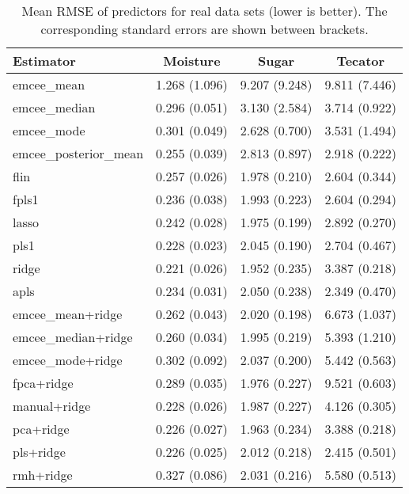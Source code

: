 \begin{table}[p]
  \centering
  \begin{tabular}{lccc}
\toprule
            \textbf{Estimator} &            \textbf{Moisture} &           \textbf{Sugar} &           \textbf{Tecator} \\
\midrule
          emcee\_mean & 1.268 (1.096) & 9.207 (9.248) & 9.811 (7.446) \\
        emcee\_median & 0.296 (0.051) & 3.130 (2.584) & 3.714 (0.922) \\
          emcee\_mode & 0.301 (0.049) & 2.628 (0.700) & 3.531 (1.494) \\
emcee\_posterior\_mean & 0.255 (0.039) & 2.813 (0.897) & 2.918 (0.222) \\
                flin & 0.257 (0.026) & 1.978 (0.210) & 2.604 (0.344) \\
               fpls1 & 0.236 (0.038) & 1.993 (0.223) & 2.604 (0.294) \\
               lasso & 0.242 (0.028) & 1.975 (0.199) & 2.892 (0.270) \\
                pls1 & 0.228 (0.023) & 2.045 (0.190) & 2.704 (0.467) \\
               ridge & 0.221 (0.026) & 1.952 (0.235) & 3.387 (0.218) \\
               apls & 0.234 (0.031) & 2.050 (0.238) & 2.349 (0.470) \\
\bottomrule
\toprule
  emcee\_mean+ridge & 0.262 (0.043) & 2.020 (0.198) & 6.673 (1.037) \\
emcee\_median+ridge & 0.260 (0.034) & 1.995 (0.219) & 5.393 (1.210) \\
  emcee\_mode+ridge & 0.302 (0.092) & 2.037 (0.200) & 5.442 (0.563) \\
        fpca+ridge & 0.289 (0.035) & 1.976 (0.227) & 9.521 (0.603) \\
      manual+ridge & 0.228 (0.026) & 1.987 (0.227) & 4.126 (0.305) \\
         pca+ridge & 0.226 (0.027) & 1.963 (0.234) & 3.388 (0.218) \\
         pls+ridge & 0.226 (0.025) & 2.012 (0.218) & 2.415 (0.501) \\
         rmh+ridge & 0.327 (0.086) & 2.031 (0.216) & 5.580 (0.513) \\
\bottomrule
\end{tabular}
  \caption{Mean RMSE of predictors for real data sets (lower is better). The corresponding standard errors are shown between brackets.}
\end{table}


